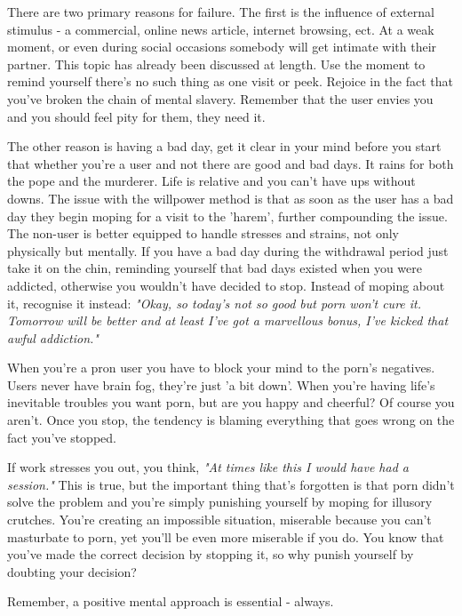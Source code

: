\documentclass[easypeasy.tex]{subfiles}
\begin{document}
There are two primary reasons for failure. The first is the influence of external stimulus - a commercial, online news article, internet browsing, ect. At a weak moment, or even during social occasions somebody will get intimate with their partner. This topic has already been discussed at length. Use the moment to remind yourself there's no such thing as one visit or peek. Rejoice in the fact that you've broken the chain of mental slavery. Remember that the user envies you and you should feel pity for them, they need it.

The other reason is having a bad day, get it clear in your mind before you start that whether you're a user and not there are good and bad days. It rains for both the pope and the murderer. Life is relative and you can't have ups without downs. The issue with the willpower method is that as soon as the user has a bad day they begin moping for a visit to the 'harem', further compounding the issue. The non-user is better equipped to handle stresses and strains, not only physically but mentally. If you have a bad day during the withdrawal period just take it on the chin, reminding yourself that bad days existed when you were addicted, otherwise you wouldn't have decided to stop. Instead of moping about it, recognise it instead: \textit{"Okay, so today's not so good but porn won't cure it. Tomorrow will be better and at least I've got a marvellous bonus, I've kicked that awful addiction."}

When you're a pron user you have to block your mind to the porn's negatives. Users never have brain fog, they're just 'a bit down'. When you're having life's inevitable troubles you want porn, but are you happy and cheerful? Of course you aren't. Once you stop, the tendency is blaming everything that goes wrong on the fact you've stopped.

If work stresses you out, you think, \textit{"At times like this I would have had a session."} This is true, but the important thing that's forgotten is that porn didn't solve the problem and you're simply punishing yourself by moping for illusory crutches. You're creating an impossible situation, miserable because you can't masturbate to porn, yet you'll be even more miserable if you do. You know that you've made the correct decision by stopping it, so why punish yourself by doubting your decision?

{\Large Remember, a positive mental approach is essential - always.}
\end{document}
